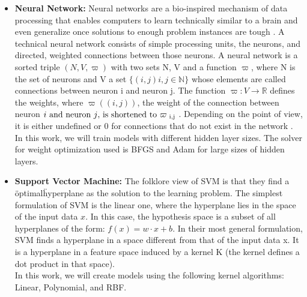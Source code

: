 \begin{itemize}
\item \textbf{Neural Network: }
Neural networks are a bio-inspired mechanism of data processing that enables computers to learn technically similar to a brain and even generalize once solutions to enough problem instances are tough \cite{Kriesel2007NeuralNetworks}. A technical neural network consists of simple processing units, the neurons, and directed, weighted connections between those neurons. A neural network is a sorted triple \((N, V, \varpi )\) with two sets N, V and a function \(\varpi\), where N is the set of neurons and V a set \(\{ (i, j) i, j \in \mathbb{N} \}\) whose elements are called connections between neuron i and neuron j. The function \( \varpi : V \rightarrow \mathbb{R}\) defines the weights, where \(\varpi((i, j))\), the weight of the connection between neuron \(i$ and neuron \(j$, is shortened to \(\varpi \textsubscript{ i,j}\) . Depending on the point of view, it is either undefined or 0 for connections that do not exist in the network \cite{Kriesel2007NeuralNetworks}. \\
In this work, we will train models with different hidden layer sizes. The solver for weight optimization used is BFGS\cite{Dai2013} and Adam\cite{adamNN} for large sizes of hidden layers.

\item \textbf{Support Vector Machine: }
The folklore view of SVM is that they find a \"optimal\" hyperplane as the solution to the learning problem. The simplest formulation of SVM is the linear one, where the hyperplane lies in the space of the input data \(x\). In this case, the hypothesis space is a subset of all hyperplanes of the form:
\(f(x) = w \cdotp x +b\).
In their most general formulation, SVM finds a hyperplane in a space different from that of the input data x. It is a hyperplane in a feature space induced by a kernel K (the kernel defines a dot product in that space)\cite{SVMEvgeniou}.\\
In this work, we will create models using the following kernel algorithms: Linear\cite{SVMTraining}, Polynomial\cite{SVMTraining}, and RBF\cite{SVMTraining}. 
\end{itemize}







